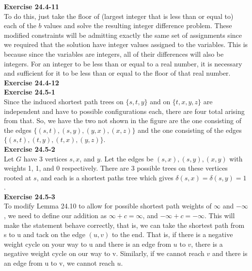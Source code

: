 \documentclass{article}
\begin{document}
\noindent\textbf{Exercise 24.4-11}\\

To do this, just take the floor of (largest integer that is less than or equal to) each of the $b$ values and solve the resulting integer difference problem. These modified constraints will be admitting exactly the same set of assignments since we required that the solution have integer values assigned to the variables. This is because since the variables are integers, all of their differences will also be integers. For an integer to be less than or equal to a real number, it is necessary and sufficient for it to be less than or equal to the floor of that real number.\\

\noindent\textbf{Exercise 24.4-12}\\



\noindent\textbf{Exercise 24.5-1}\\

Since the induced shortest path trees on $\{s,t,y\}$ and on $\{t,x,y,z\}$ are independent and have to possible configurations each, there are four total arising from that. So, we have the two not shown in the figure are the one consisting of the edges $\{(s,t),(s,y),(y,x),(x,z)\}$ and the one consisting of the edges $\{(s,t),(t,y),(t,x),(y,z)\}$.\\

\noindent\textbf{Exercise 24.5-2}\\

Let $G$ have 3 vertices $s, x$, and $y$. Let the edges be $(s,x), (s,y), (x,y)$ with weights 1, 1, and 0 respectively.  There are 3 possible trees on these vertices rooted at $s$, and each is a shortest paths tree which gives $\delta(s,x) = \delta(s,y) = 1$. \\

\noindent\textbf{Exercise 24.5-3}\\

To modify Lemma 24.10 to allow for possible shortest path weights of $\infty$ and $-\infty$, we need to define our addition as $\infty + c = \infty$, and $-\infty + c = -\infty$. This will make the statement behave correctly, that is, we can take the shortest path from s to u and tack on the edge $(u,v)$ to the end. That is, if there is a negative weight cycle on your way to u and there is an edge from $u$ to $v$, there is a negative weight cycle on our way to v. Similarly, if we cannot reach $v$ and there is an edge from u to v, we cannot reach $u$.\\
\end{document}

